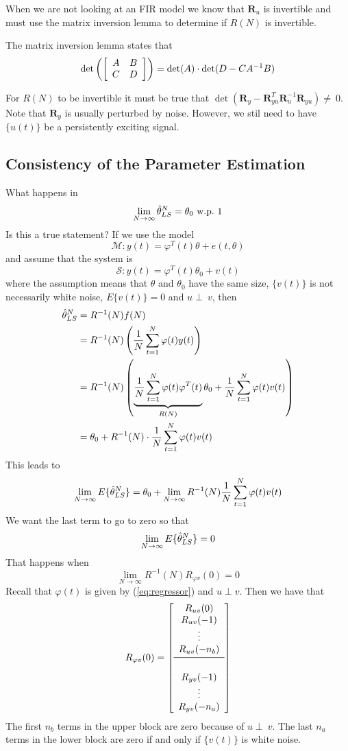 When we are not looking at an FIR model we know that $\mathbf{R}_u$ is invertible and must use the matrix inversion lemma to determine if $R(N)$ is invertible.
\begin{definition}
The matrix inversion lemma states that
$$\det\left(\left[\begin{array}{c c}A&B\\C&D\end{array}\right]\right) = \det(A) \cdot \det(D-CA^{-1}B)$$
\end{definition}
For $R (N)$ to be invertible it must be true that $\det(\mathbf{R}_y-\mathbf{R}_{yu}^T\mathbf{R}_u^{-1}\mathbf{R}_{yu})\neq~0$.
Note that $\mathbf{R}_y$ is usually perturbed by noise.
However, we stil need to have $\{u (t)\}$ be a persistently exciting signal.

\subsection{Consistency of the Parameter Estimation}
\label{sec:peconsistency}
What happens in
$$\lim_{N\to\infty} \hat{\theta}_{LS}^N=\theta_0 \text{~w.p.~} 1$$
Is this a true statement? If we use the model
$$\mathcal{M}: y (t) = \varphi^T (t)\theta+e (t,\theta)$$
and assume that the system is
$$\mathcal{S}: y (t) = \varphi^T (t)\theta_0 + v (t)$$
where the assumption means that $\theta$ and $\theta_0$ have the same size, $\{v (t)\}$ is not necessarily white noise, $E\{v (t)\} = 0$ and $u\perp~v$, then
\begin{align}
\label{eq:thn}
\hat{\theta}_{LS}^N &= R^{-1}(N)f(N) \nonumber \\
&= R^{-1}(N)\left(\frac{1}{N}\sum_{t=1}^N\varphi(t)y(t)\right) \nonumber \\
&= R^{-1}(N)\left( \underbrace{\frac{1}{N}\sum_{t=1}^N\varphi(t)\varphi^T(t)}_{R(N)}\theta_0+\frac{1}{N}\sum_{t=1}^N\varphi(t)v(t)\right) \nonumber\\
&= \theta_0 + R^{-1}(N)\cdot \frac{1}{N}\sum_{t=1}^N\varphi(t)v(t)
\end{align}
This leads to
$$\lim_{N\to\infty} E\{\hat{\theta}_{LS}^N\} = \theta_0 + \lim_{N\to\infty}R^{-1}(N)\frac{1}{N}\sum_{t=1}^N\varphi(t)v(t)$$
We want the last term to go to zero so that
$$\lim_{N\to\infty} E\{\hat{\theta}_{LS}^N\} = 0$$
That happens when
$$\lim_{N\to\infty} R^{-1}(N)R_{\varphi v}(0) = 0$$
Recall that $\varphi(t)$ is given by (\ref{eq:regressor}) and $u\perp v$.
Then we have that
$$R_{\varphi v}(0) = \left[\begin{array}{c} R_{uv}(0) \\ R_{uv}(-1) \\ \vdots \\ R_{uv}(-n_b) \\ \midrule \\ R_{yv}(-1) \\ \vdots \\ R_{yv}(-n_a) \end{array}\right]$$
The first $n_b$ terms in the upper block are zero because of $u\perp~v$.
The last $n_a$ terms in the lower block are zero if and only if $\{v (t)\}$ is white noise.

